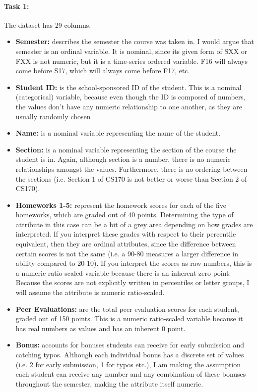 \documentclass{article}
\begin{document}
\paragraph{\textbf{Task 1:}} The dataset has 29 columns. 
\begin{itemize}
    \item \textbf{Semester:} describes the semester the course was taken in. I would argue that semester is an ordinal variable. It is nominal, since its given form of SXX or FXX is not numeric, but it is a time-series ordered variable. F16 will always come before S17, which will always come before F17, etc. 
    \item \textbf{Student ID:} is the school-sponsored ID of the student. This is a nominal (categorical) variable, because even though the ID is composed of numbers, the values don't have any numeric relationship to one another, as they are usually randomly chosen
    \item \textbf{Name:} is a nominal variable representing the name of the student. 
    \item \textbf{Section:} is a nominal variable representing the section of the course the student is in. Again, although section is a number, there is no numeric relationships amongst the values. Furthermore, there is no ordering between the sections (i.e. Section 1 of CS170 is not better or worse than Section 2 of CS170). 
    \item \textbf{Homeworks 1-5:} represent the homework scores for each of the five homeworks, which are graded out of 40 points. Determining the type of attribute in this case can be a bit of a grey area depending on how grades are interpreted. If you interpret these grades with respect to their percentile equivalent, then they are ordinal attributes, since the difference between certain scores is not the same (i.e. a 90-80 measures a larger difference in ability compared to 20-10). If you interpret the scores as raw numbers, this is a numeric ratio-scaled variable because there is an inherent zero point. Because the scores are not explicitly written in percentiles or letter groups, I will assume the attribute is numeric ratio-scaled. 
    \item \textbf{Peer Evaluations:} are the total peer evaluation scores for each student, graded out of 150 points. This is a numeric ratio-scaled variable because it has real numbers as values and has an inherent 0 point.
    \item \textbf{Bonus:} accounts for bonuses students can receive for early submission and catching typos. Although each individual bonus has a discrete set of values (i.e. 2 for early submission, 1 for typos etc.), I am making the assumption each student can receive any number and any combination of these bonuses throughout the semester, making the attribute itself numeric. 

\end{itemize}
\end{document}
